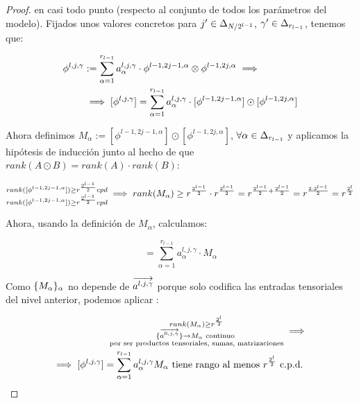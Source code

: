 \begin{proof}
    en casi todo punto (respecto al conjunto de todos los parámetros del modelo). Fijados unos valores concretos para $j' \in \Delta_{N/2^{l-1}}$, $\gamma' \in \Delta_{r_{l-1}}$, tenemos que:

    \begin{equation}
    \begin{split}
        \phi^{l, j, \gamma} &:= \sum_{\alpha = 1}^{r_{l-1}} a_{\alpha}^{l, j, \gamma} \cdot \phi^{l-1, 2j-1, \alpha} \otimes \phi^{l-1, 2j, \alpha} \implies \\
        &\implies [\phi^{l, j, \gamma}] = \sum_{\alpha = 1}^{r_{l-1}} a_{\alpha}^{l, j, \gamma} \cdot [\phi^{l-1, 2j-1, \alpha}] \odot [\phi^{l-1, 2j, \alpha}]
    \end{split}
    \end{equation}

    Ahora definimos $M_\alpha := [\phi^{l-1, 2j-1, \alpha}] \odot [\phi^{l-1, 2j, \alpha}]$, $\forall \alpha \in \Delta_{r_{l-1}}$ y aplicamos la hipótesis de inducción junto al hecho de que $rank(A \odot B) = rank(A) \cdot rank(B)$:

    \begin{equation}
    \begin{split}
        \substack{rank([\phi^{l-1, 2j-1, \alpha}]) \geq r^{\frac{2^{l-1}}{2}} cpd \\ rank([\phi^{l-1, 2j-1, \alpha}]) \geq r^{\frac{2^{l-1}}{2}} cpd} \implies         rank(M_\alpha) \geq r^{\frac{2^{l-1}}{2}} \cdot r^{\frac{2^{l-1}}{2}} = r^{\frac{2^{l-1}}{2} + \frac{2^{l-1}}{2}} =
        r^{\frac{2 \cdot 2^{l - 1}}{2}} = r^{\frac{2^{l}}{2}} \\
    \end{split}
    \end{equation}

    Ahora, usando la definición de $M_\alpha$, calculamos:

    \begin{equation}
        [\phi^{l, j, \gamma}] = \sum_{\alpha = 1}^{r_{l-1}} a_{\alpha}^{l, j, \gamma} \cdot M_\alpha
    \end{equation}

    Como $\{ M_\alpha \}_\alpha$ no depende de $\overrightarrow{a^{l, j, \gamma}}$ porque solo codifica las entradas tensoriales del nivel anterior, podemos aplicar :

    \begin{equation}
    \begin{split}
        \substack{
            rank(M_\alpha) \geq r^{\frac{2^l}{2}}\\
            \{ \overrightarrow{a^{0, j, \gamma}} \} \to M_\alpha \text{ continuo } \\
            \text{por ser productos tensoriales, sumas, matrizaciones}
        } \implies \\
        \implies [\phi^{l, j, \gamma}] = \sum_{\alpha = 1}^{r_{l-1}} a_\alpha^{l,j,\gamma} M_\alpha \text{ tiene rango al menos } r^{\frac{2^l}{2}} \text{ c.p.d. }
    \end{split}
    \end{equation}


\end{proof}
